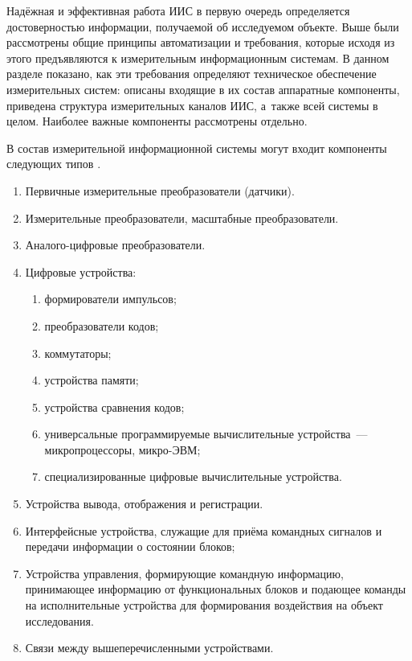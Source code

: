 \documentclass[a4paper, 14pt, titlepage]{extarticle}
\begin{document}
  Надёжная и эффективная работа ИИС в первую очередь определяется достоверностью информации,
  получаемой об исследуемом объекте. Выше были рассмотрены общие принципы автоматизации и
  требования, которые исходя из этого предъявляются к измерительным информационным системам.
  В данном разделе показано, как эти требования определяют техническое обеспечение измерительных систем: описаны входящие в их
  состав аппаратные компоненты, приведена структура измерительных каналов ИИС, а~также всей системы
  в целом. Наиболее важные компоненты рассмотрены отдельно.


  В состав измерительной информационной системы могут входит компоненты следующих типов
  \cite[с.~15]{volkov-iis}.
  \begin{enumerate}
    \item Первичные измерительные преобразователи (датчики).
    \item Измерительные преобразователи, масштабные преобразователи.
    \item Аналого-цифровые преобразователи.
    \item Цифровые устройства:
      \begin{enumerate}
        \item формирователи импульсов;
        \item преобразователи кодов;
        \item коммутаторы;
        \item устройства памяти;
        \item устройства сравнения кодов;
        \item универсальные программируемые вычислительные устройства~--- микропроцессоры, микро-ЭВМ;
        \item специализированные цифровые вычислительные устройства.
      \end{enumerate}
    \item Устройства вывода, отображения и регистрации.
    \item Интерфейсные устройства, служащие для приёма командных сигналов и передачи информации о
      состоянии блоков;
    \item Устройства управления, формирующие командную информацию, принимающее информацию от
      функциональных блоков и подающее команды на исполнительные устройства для формирования
      воздействия на объект исследования.
    \item Связи между вышеперечисленными устройствами.
  \end{enumerate}
\end{document}
